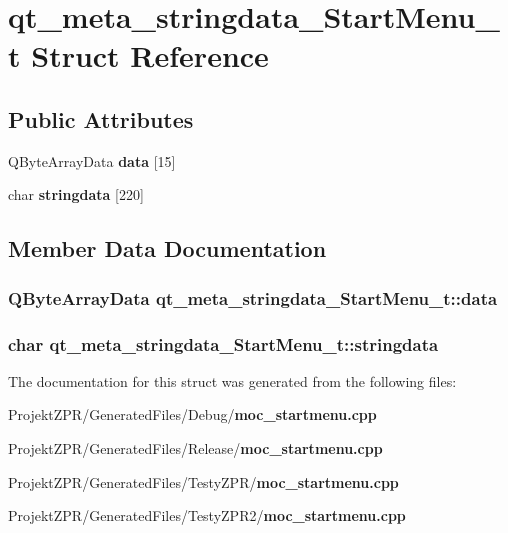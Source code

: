 \section{qt\-\_\-meta\-\_\-stringdata\-\_\-\-Start\-Menu\-\_\-t Struct Reference}
\label{structqt__meta__stringdata___start_menu__t}
\subsection*{Public Attributes}
\begin{DoxyCompactItemize}
\item 
Q\-Byte\-Array\-Data {\bf data} [15]
\item 
char {\bf stringdata} [220]
\end{DoxyCompactItemize}


\subsection{Member Data Documentation}
\subsubsection[{data}]{\setlength{\rightskip}{0pt plus 5cm}Q\-Byte\-Array\-Data qt\-\_\-meta\-\_\-stringdata\-\_\-\-Start\-Menu\-\_\-t\-::data}\label{structqt__meta__stringdata___start_menu__t_ae509bf58298e44ba59c1b5460d7b8e7a}
\subsubsection[{stringdata}]{\setlength{\rightskip}{0pt plus 5cm}char qt\-\_\-meta\-\_\-stringdata\-\_\-\-Start\-Menu\-\_\-t\-::stringdata}\label{structqt__meta__stringdata___start_menu__t_aacde7f105462fe9ea00fe7c49dc06124}


The documentation for this struct was generated from the following files\-:\begin{DoxyCompactItemize}
\item 
Projekt\-Z\-P\-R/\-Generated\-Files/\-Debug/{\bf moc\-\_\-startmenu.\-cpp}\item 
Projekt\-Z\-P\-R/\-Generated\-Files/\-Release/{\bf moc\-\_\-startmenu.\-cpp}\item 
Projekt\-Z\-P\-R/\-Generated\-Files/\-Testy\-Z\-P\-R/{\bf moc\-\_\-startmenu.\-cpp}\item 
Projekt\-Z\-P\-R/\-Generated\-Files/\-Testy\-Z\-P\-R2/{\bf moc\-\_\-startmenu.\-cpp}\end{DoxyCompactItemize}
